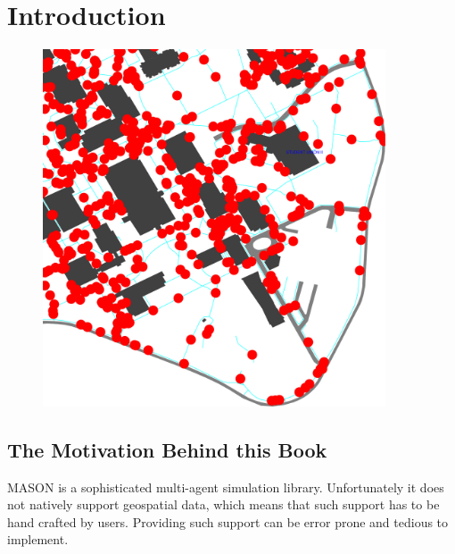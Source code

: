 \documentclass[twoside,10pt]{book}
\begin{document}
\normalsize
\cleardoublepage

\tableofcontents
\clearpage


\chapter{Introduction}
\label{ch:intro}

\begin{figure}[h]\vspace{-33em}\hspace{30em}\includegraphics[width=4in]{campus.pdf}\vspace{2em}\end{figure}


\section{The Motivation Behind this Book}



MASON is a sophisticated multi-agent simulation library.
Unfortunately it does not natively support geospatial data, which
means that such support has to be hand crafted by users.  Providing
such support can be error prone and tedious to implement.
\end{document}
